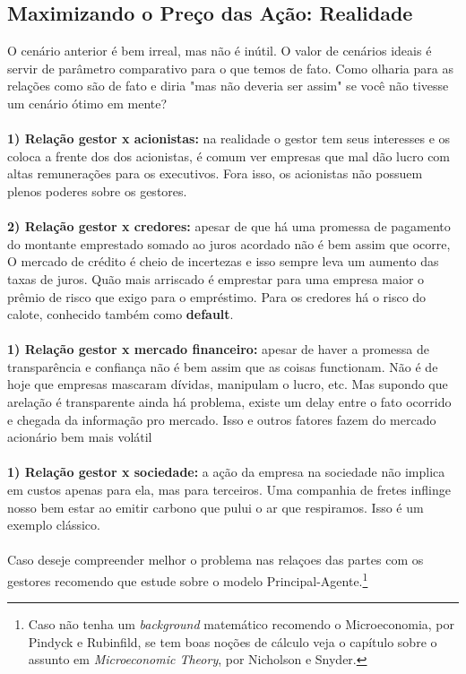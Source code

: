 \subsection*{Maximizando o Preço das Ação: Realidade}
O cenário anterior é bem irreal, mas não é inútil. O valor de cenários ideais é servir de parâmetro comparativo para o que temos de fato. Como olharia para as relações como são de fato e diria "mas não deveria ser assim" se você não tivesse um cenário ótimo em mente? 
\\~\\
\textbf{1) Relação gestor x acionistas:} na realidade o gestor tem seus interesses e os coloca a frente dos dos acionistas, é comum ver empresas que mal dão lucro com altas remunerações para os executivos. Fora isso, os acionistas não possuem plenos poderes sobre os gestores.
\\~\\
\textbf{2) Relação gestor x credores:} apesar de que há uma promessa de pagamento do montante emprestado somado ao juros acordado não é bem assim que ocorre, O mercado de crédito é cheio de incertezas e isso sempre leva um aumento das taxas de juros. Quão mais arriscado é emprestar para uma empresa maior o prêmio de risco que exigo para o empréstimo. Para os credores há o risco do calote, conhecido também como \textbf{default}.
\\~\\
\textbf{1) Relação gestor x mercado financeiro:} apesar de haver a promessa de transparência e confiança não é bem assim que as coisas functionam. Não é de hoje que empresas mascaram dívidas, manipulam o lucro, etc. Mas supondo que arelação é transparente ainda há problema, existe um delay entre o fato ocorrido e chegada da informação pro mercado. Isso e outros fatores fazem do mercado acionário bem mais volátil
\\~\\
\textbf{1) Relação gestor x sociedade:} a ação da empresa na sociedade não implica em custos apenas para ela, mas para terceiros. Uma companhia de fretes inflinge nosso bem estar ao emitir carbono que pului o ar que respiramos. Isso é um exemplo clássico.
\\~\\
Caso deseje compreender melhor o problema nas relaçoes das partes com os gestores recomendo que estude sobre o modelo Principal-Agente.\footnote{Caso não tenha um \textit{background} matemático recomendo o Microeconomia, por Pindyck e Rubinfild, se tem boas noções de cálculo veja o capítulo sobre o assunto em  \textit{Microeconomic Theory}, por Nicholson e Snyder.}

